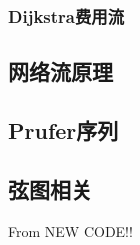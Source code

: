 \documentclass[a4paper, twoside]{article}
\begin{document}
\begin{multicols}{2}
				\subsubsection{Dijkstra费用流}
					



			

			\subsection{网络流原理}
				
			
			\subsection{Prufer序列}
				

			\subsection{弦图相关}
				From NEW CODE!!
				



			




\end{multicols}
\end{document}

